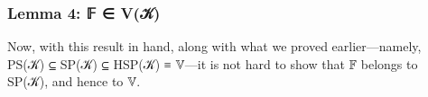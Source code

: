 \subsubsection{Lemma 4: 𝔽 ∈ V(𝒦)}\label{lemma-4-ux1d53d-vux1d4a6}
Now, with this result in hand, along with what we proved earlier---namely, \ad P\ad S(\ab 𝒦) \aof ⊆ \ad S\ad P(\ab 𝒦) \aof ⊆ \ad H\ad S\ad P(\ab 𝒦) \aof ≡ \af 𝕍---it is not hard to show that \af 𝔽 belongs to \ad S\ad P(\ab 𝒦), and hence to \af 𝕍.
\ccpad
\begin{code}%
%
\>[1]\AgdaSpace{}%
\AgdaSpace{}%
\AgdaSymbol{\{}\AgdaSpace{}%
\AgdaSymbol{=}\AgdaSpace{}%
\AgdaSymbol{\}\{}\AgdaSpace{}%
\AgdaSymbol{=}\AgdaSpace{}%
\AgdaSymbol{\}}\<%
\\
%
\\[\AgdaEmptyExtraSkip]%
%
\>[1]\AgdaSpace{}%
\AgdaSymbol{:}\AgdaSpace{}%
\AgdaSpace{}%
\AgdaSpace{}%
\AgdaSpace{}%
\AgdaSpace{}%
\AgdaSpace{}%
\AgdaSpace{}%
\AgdaSpace{}%
\AgdaSymbol{(}\AgdaSymbol{\{}\AgdaSymbol{\}\{}\AgdaSymbol{\}}\AgdaSpace{}%
\AgdaSymbol{(}\AgdaSymbol{\{}\AgdaSymbol{\}\{}\AgdaSymbol{\}}\AgdaSpace{}%
\AgdaSymbol{))}\<%
\\
%
\>[1]\AgdaSpace{}%
\AgdaSpace{}%
\AgdaSymbol{=}\AgdaSpace{}%
\AgdaSpace{}%
\AgdaSpace{}%
\AgdaSymbol{(}\AgdaSpace{}%
\AgdaSymbol{)}\<%
\\
\>[1][@{}l@{\AgdaIndent{0}}]%
\>[2]\<%
\\
\>[2][@{}l@{\AgdaIndent{0}}]%
\>[3]\AgdaSpace{}%
\AgdaSymbol{:}\AgdaSpace{}%
\AgdaSpace{}%
\AgdaSpace{}%
\AgdaSymbol{(}\AgdaSymbol{\{}\AgdaSymbol{\}\{}\AgdaSymbol{\}}\AgdaSpace{}%
\AgdaSymbol{(}\AgdaSymbol{\{}\AgdaSymbol{\}\{}\AgdaSymbol{\}}\AgdaSpace{}%
\AgdaSymbol{))}\<%
\\
%
\>[3]\AgdaSpace{}%
\AgdaSymbol{=}\AgdaSpace{}%
\AgdaSymbol{(}\AgdaSpace{}%
\AgdaSymbol{)}\<%
\\
%
\\[\AgdaEmptyExtraSkip]%
%
\>[1]\AgdaSpace{}%
\AgdaSymbol{:}\AgdaSpace{}%
\AgdaSpace{}%
\AgdaSpace{}%
\AgdaSpace{}%
\AgdaSpace{}%
\AgdaSpace{}%
\AgdaSpace{}%
\AgdaSpace{}%
\<%
\\
%
\>[1]\AgdaSpace{}%
\AgdaSpace{}%
\AgdaSymbol{=}\AgdaSpace{}%
\AgdaSpace{}%
\AgdaSymbol{(}\AgdaSpace{}%
\AgdaSymbol{)}\<%
\end{code}
